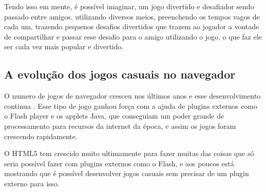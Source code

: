 Tendo isso em mente, é possível imaginar, um jogo divertido e desafiador
sendo passado entre amigos, utilizando diversos meios, preenchendo os
tempos vagos de cada um, trazendo pequenos desafios divertidos que
trazem ao jogador a vontade de compartilhar e passar esse desafio para
o amigo utilizando o jogo, o que faz ele ser cada vez mais popular e
divertido.

\subsection{A evolução dos jogos casuais no navegador}

O numero de jogos de navegador cresceu nos últimos anos e esse
desenvolvimento continua \cite{ozcan2010recent}. Esse tipo de jogo
ganhou força com a ajuda de plugins externos como o Flash player e
os applets Java, que conseguiam um poder grande de processamento para
recursos da internet da época, e assim os jogos foram crescendo rapidamente.

O HTML5 tem crescido muito ultimamente para fazer muitas das coisas
que só seria possível fazer com plugins externos como o Flash, e aos
poucos está mostrando que é possível desenvolver jogos casuais sem
precisar de um plugin externo para isso.

